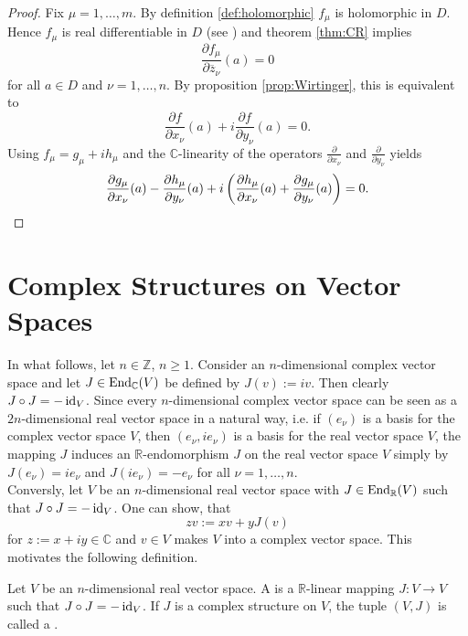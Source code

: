 \begin{proof}
Fix $\mu = 1,\dots,m$. By definition \ref{def:holomorphic} $f_\mu$ is holomorphic in $D$. Hence $f_\mu$ is real differentiable in $D$ (see \cite[27]{grauert:complex_manifolds:2010}) and theorem \ref{thm:CR} implies
\begin{equation*}
\frac{\partial f_\mu}{\partial \overline{z}_\nu}(a) = 0
\end{equation*}
\noindent for all $a \in D$ and $\nu = 1,\dots,n$. By proposition \ref{prop:Wirtinger}, this is equivalent to 
\begin{equation*}
\frac{\partial f}{\partial x_\nu}(a) + i \frac{\partial f}{\partial y_\nu}(a) = 0.
\end{equation*}
Using $f_\mu = g_\mu + i h_\mu$ and the $\mathbb{C}$-linearity of the operators $\frac{\partial}{\partial x_\nu}$ and $\frac{\partial}{\partial y_\nu}$ yields
\begin{equation*}
\frac{\partial g_\mu}{\partial x_\nu}(a) - \frac{\partial h_\mu}{\partial y_\nu}(a) + i \del[3]{ \frac{\partial h_\mu}{\partial x_\nu}(a) + \frac{\partial g_\mu}{\partial y_\nu}(a)} = 0.
\end{equation*}
\end{proof}

\section{Complex Structures on Vector Spaces}
In what follows, let $n \in \mathbb{Z}$, $n \geq 1$. Consider an $n$-dimensional complex vector space and let $J \in \operatorname{End}_\mathbb{C}(V)$ be defined by $J(v) := iv$. Then clearly $J \circ J = -\operatorname{id}_V$. Since every $n$-dimensional complex vector space can be seen as a $2n$-dimensional real vector space in a natural way, i.e. if $(e_\nu)$ is a basis for the complex vector space $V$, then $(e_\nu,ie_\nu)$ is a basis for the real vector space $V$, the mapping $J$ induces an $\mathbb{R}$-endomorphism $J$ on the real vector space $V$ simply by $J(e_\nu) = ie_\nu$ and $J(ie_\nu) = -e_\nu$ for all $\nu = 1,\dots,n$.\\
Conversly, let $V$ be an $n$-dimensional real vector space with $J \in \operatorname{End}_\mathbb{R}(V)$ such that $J \circ J = -\operatorname{id}_V$. One can show, that 
\begin{equation}
zv := xv + yJ(v)
\label{eq:complex}
\end{equation}
\noindent for $z := x + iy \in \mathbb{C}$ and $v \in V$ makes $V$ into a complex vector space. This motivates the following definition.
\begin{definition}
Let $V$ be an $n$-dimensional real vector space. A  is a $\mathbb{R}$-linear mapping $J: V \to V$ such that $J \circ J = -\operatorname{id}_V$. If $J$ is a complex structure on $V$, the tuple $(V,J)$ is called a .
\end{definition}

